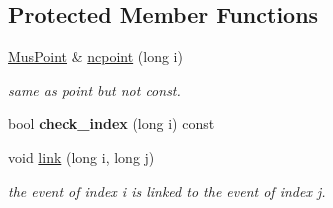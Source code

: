 \subsection*{Protected Member Functions}
\begin{DoxyCompactItemize}
\item 
\mbox{\hyperlink{classMusPoint}{Mus\+Point}} \& \mbox{\hyperlink{group__segment_ga2dbfcbf9664a10c1245e298b9257d5cd}{ncpoint}} (long i)
\begin{DoxyCompactList}\small\item\em same as point but not const. \end{DoxyCompactList}\item 
bool {\bfseries check\+\_\+index} (long i) const
\item 
void \mbox{\hyperlink{group__segment_ga43310a16681e2241b20da4b68de9f35b}{link}} (long i, long j)
\begin{DoxyCompactList}\small\item\em the event of index i is linked to the event of index j. \end{DoxyCompactList}\end{DoxyCompactItemize}
